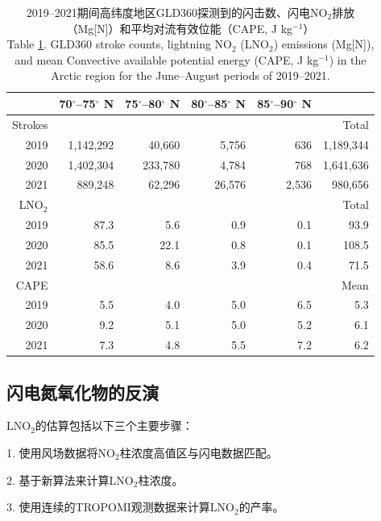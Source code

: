 \begin{table}
\centering
\caption{2019--2021期间高纬度地区GLD360探测到的闪击数、闪电NO$_2$排放（Mg[N]）和平均对流有效位能（CAPE, J kg$^{-1}$）\\
Table \ref{table:arctic_emission}. GLD360 stroke counts, lightning NO$_2$ (LNO$_2$) emissions (Mg[N]), and mean Convective available potential energy (CAPE, J kg$^{-1}$) in the Arctic region for the June--August periods of 2019--2021.
}
\label{table:arctic_emission}
\begin{tabular}{rrrrrr}
\hline
{} & 70$^{\circ}$--75$^{\circ}$ N & 75$^{\circ}$--80$^{\circ}$ N &
80$^{\circ}$--85$^{\circ}$ N &  85$^{\circ}$--90$^{\circ}$ N &  \\
\hline
Strokes & & & & & Total \\
\hline
2019 &   1,142,292 &     40,660 &      5,756 &       636  & 1,189,344 \\
2020 &   1,402,304 &    233,780 &      4,784 &       768  &  1,641,636 \\
2021 &     889,248 &     62,296 &     26,576 &      2,536  &  980,656 \\
\hline
LNO$_2$ & & & & & Total \\
\hline
2019 &      87.3 &       5.6 &       0.9 &       0.1 &   93.9 \\
2020 &      85.5 &      22.1 &       0.8 &       0.1 &  108.5 \\
2021 &      58.6 &       8.6 &       3.9 &       0.4 &   71.5 \\
\hline
CAPE & & & & & Mean \\
\hline
2019 & 5.5  & 4.0  & 5.0  & 6.5 & 5.3 \\
2020 & 9.2  & 5.1  & 5.0  & 5.2 & 6.1 \\
2021 & 7.3  & 4.8  & 5.5  & 7.2 & 6.2 \\
\hline
\end{tabular}
\end{table}


\subsection{闪电氮氧化物的反演}

LNO$_2$的估算包括以下三个主要步骤：

1. 使用风场数据将NO$_2$柱浓度高值区与闪电数据匹配。

2. 基于新算法来计算LNO$_2$柱浓度。

3. 使用连续的TROPOMI观测数据来计算LNO$_2$的产率。

